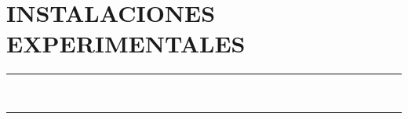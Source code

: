 \pagestyle{plain}
\chapter{INSTALACIONES EXPERIMENTALES}\label{cap:InstalacionesExperimentales}
\vspace{0.2cm}
\rule{\linewidth}{1.5pt}\\
\startcontents[chapters]
\vspace{0.2cm}
\rule{\linewidth}{1.5pt}\\
\newpage

\newpage
		

